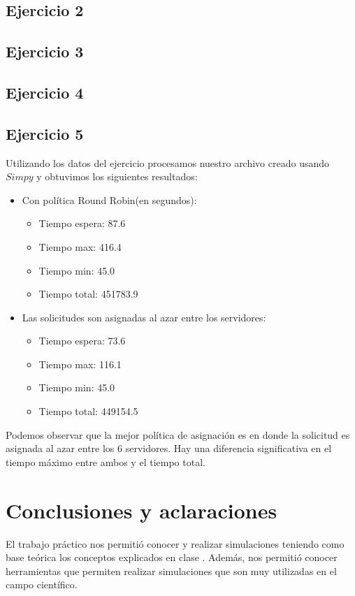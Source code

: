 \documentclass[11pt,a4paper]{article}
\begin{document}
	\subsection{Ejercicio 2}
	    
		
	\subsection{Ejercicio 3}
	    



	\subsection{Ejercicio 4}

	\subsection{Ejercicio 5}
		Utilizando los datos del ejercicio procesamos nuestro archivo creado usando $Simpy$ y obtuvimos los siguientes resultados:
		\begin{itemize}
			\item Con política Round Robin(en segundos):
				\begin{itemize}
					\item Tiempo espera: 87.6
					\item Tiempo max: 416.4
					\item Tiempo min: 45.0
					\item Tiempo total: 451783.9
				\end{itemize}
			\item Las solicitudes son asignadas al azar entre los servidores:
				\begin{itemize}
					\item Tiempo espera: 73.6
					\item Tiempo max: 116.1
					\item Tiempo min: 45.0
					\item Tiempo total: 449154.5
				\end{itemize}
		\end{itemize}

		Podemos observar que la mejor política de asignación es en donde la solicitud es asignada al azar entre los 6 servidores. Hay una diferencia significativa en el tiempo máximo entre ambos y el tiempo total.

\section{Conclusiones y aclaraciones}
El trabajo práctico nos permitió conocer y realizar simulaciones teniendo como base teórica los conceptos explicados en clase . Además, nos permitió conocer herramientas que permiten realizar simulaciones que son muy utilizadas en el campo científico.
\end{document}
